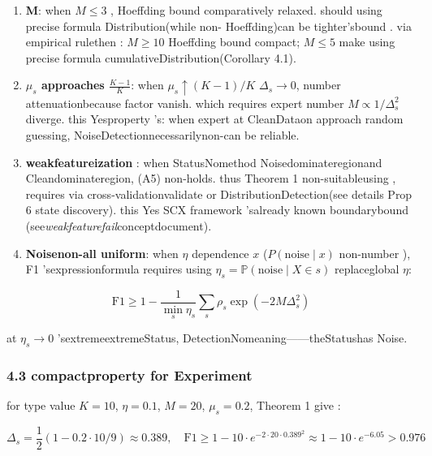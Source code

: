 \documentclass[
  12pt,
]{article}
\begin{document}
\begin{enumerate}
\def\labelenumi{\arabic{enumi}.}
\item
  \textbf{ M}: when  \(M \leq 3\) , Hoeffding
  bound comparatively relaxed. should using precise formula Distribution(while non-
  Hoeffding)can be tighter'sbound . via empirical rulethen : \(M \geq 10\)  Hoeffding
  bound compact; \(M \leq 5\) make using precise formula cumulativeDistribution(Corollary 4.1). 
\item
  \textbf{\(\mu_s\) approaches \(\frac{K-1}{K}\)}: when 
  \(\mu_s \uparrow (K-1)/K\) 
  \(\Delta_s \to 0\), number attenuationbecause factor vanish. which requires expert number 
  \(M \propto 1/\Delta_s^2\)
  diverge. this Yesproperty 's: when expert at CleanDataon approach random guessing, NoiseDetectionnecessarilynon-can be reliable. 
\item
  \textbf{weakfeatureization }:
  when StatusNomethod Noisedominateregionand Cleandominateregion, (A5) non-holds. thus
  Theorem 1 non-suitableusing , requires via cross-validationvalidate or DistributionDetection(see details Prop 6
  state discovery). this Yes SCX
  framework 'salready known boundarybound (see\emph{weakfeaturefail}conceptdocument). 
\item
  \textbf{Noisenon-all uniform}: when  \(\eta\) dependence \(x\)
  (\(P(\text{noise} \mid x)\) non-number ), F1 'sexpressionformula requires using 
  \(\eta_s = \mathbb{P}(\text{noise} \mid X \in s)\) replaceglobal  \(\eta\): 
\end{enumerate}

\[\text{F1} \geq 1 - \frac{1}{\min_s \eta_s} \sum_s \rho_s \exp(-2M\Delta_s^2)\]

at  \(\eta_s \to 0\) 'sextremeextremeStatus, DetectionNomeaning------theStatushas Noise. 

\subsubsection{4.3
compactproperty for Experiment}\label{ux7d27ux81f4ux6027ux5bf9ux6bd4ux5b9eux9a8c}

for type value  \(K=10\), \(\eta=0.1\), \(M=20\), \(\mu_s=0.2\), Theorem 1
give : 

\[\Delta_s = \frac{1}{2}(1 - 0.2 \cdot 10/9) \approx 0.389, \quad \text{F1} \geq 1 - 10 \cdot e^{-2\cdot 20 \cdot 0.389^2} \approx 1 - 10 \cdot e^{-6.05} > 0.976\]
\end{document}
